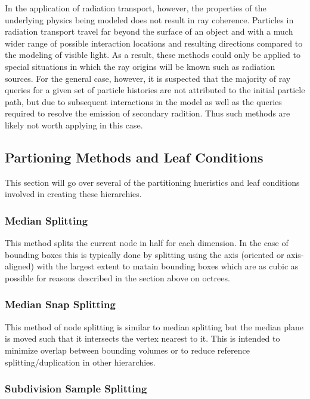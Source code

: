 \documentclass[12pt, a4paper]{article}
\begin{document}
In the application of radiation transport, however, the properties of the underlying physics being modeled does not result in ray coherence. Particles in radiation transport travel far beyond the surface of an object and with a much wider range of possible interaction locations and resulting directions compared to the modeling of visible light. As a result, these methods could only be applied to special situations in which the ray origins will be known such as radiation sources. For the general case, however, it is suspected that the majority of ray queries for a given set of particle histories are not attributed to the initial particle path, but due to subsequent interactions in the model as well as the queries required to resolve the emission of secondary radition. Thus such methods are likely not worth applying in this case.

\subsection{Partioning Methods and Leaf Conditions}%

This section will go over several of the partitioning hueristics and leaf conditions involved in creating these hierarchies.

\subsubsection{Median Splitting}%

This method splits the current node in half for each dimension. In the case of bounding boxes this is typically done by splitting using the axis (oriented or axis-aligned) with the largest extent to matain bounding boxes which are as cubic as possible for reasons described in the section above on octrees.

\subsubsection{Median Snap Splitting}%

This method of node splitting is similar to median splitting but the median plane is moved such that it intersects the vertex nearest to it. This is intended to minimize overlap between bounding volumes or to reduce reference splitting/duplication in other hierarchies. 

\subsubsection{Subdivision Sample Splitting}%
\end{document}
